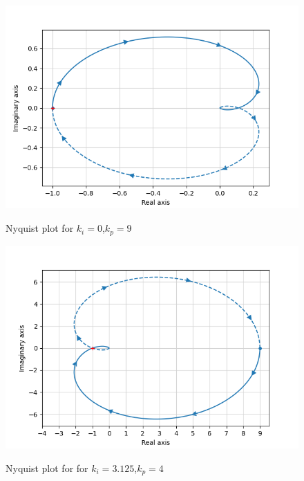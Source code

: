 \documentclass[journal,12pt,onecolumn]{IEEEtran}
\theoremstyle{remark}
\begin{document}
\begin{enumerate}
\begin{figure}[!ht]    
    \centering
\graphicspath{ {2021/EC/48/figs} }
\includegraphics[width=\columnwidth]{plot_2}
\label{figure:ee25-gate4-nyquist2}
\caption{Nyquist plot for $k_i=0$,$k_p=9$}
\end{figure}

\begin{figure}[!ht]    
    \centering
\graphicspath{ {2021/EC/48/figs} }
\includegraphics[width=\columnwidth]{plot_3}
\label{figure:ee25-gate4-nyquist3}
\caption{Nyquist plot for for $k_i=3.125$,$k_p=4$}
\end{figure}
     \end{enumerate}

  
   
    
\end{document}
